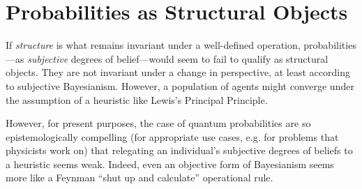 






\section{Probabilities as Structural Objects}














If \emph{structure} is what remains invariant under a well-defined operation, probabilities---as \emph{subjective} degrees of belief---would seem to fail to qualify as structural objects.  They are not invariant under a change in perspective, at least according to subjective Bayesianism.  However, a population of agents might converge under the assumption of a heuristic like Lewis's Principal Principle.

However, for present purposes, the case of quantum probabilities are so epistemologically compelling (for appropriate use cases, e.g. for problems that physicists work on) that relegating an individual's subjective degrees of beliefs to a heuristic seems weak.  Indeed, even an objective form of Bayesianism seems more like a Feynman ``shut up and calculate'' operational rule.  

